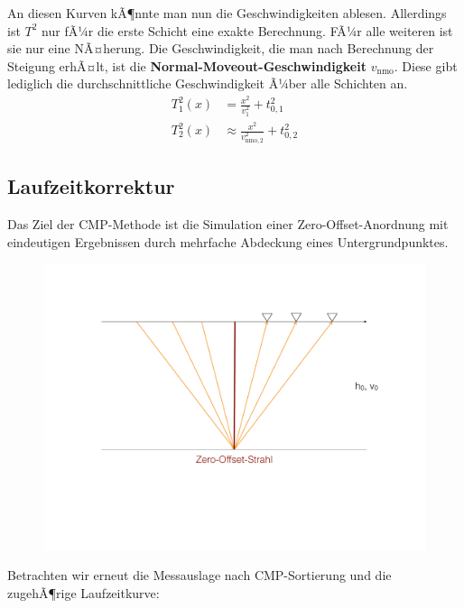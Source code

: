 An diesen Kurven kÃ¶nnte man nun die Geschwindigkeiten ablesen. Allerdings ist $T^2$ nur fÃ¼r die erste Schicht eine exakte Berechnung. FÃ¼r alle weiteren ist sie nur eine NÃ¤herung. Die Geschwindigkeit, die man nach Berechnung der Steigung erhÃ¤lt, ist die \textbf{Normal-Moveout-Geschwindigkeit} $v_{\text{nmo}}$. Diese gibt lediglich die durchschnittliche Geschwindigkeit Ã¼ber alle Schichten an. \begin{align*}
	T_1^2(x) &= \frac{x^2}{v_1^2} + t_{0,1}^2 \\
	T_2^2(x) &\approx \frac{x^2}{v_{\text{nmo},2}^2} + t_{0,2}^2
\end{align*}

\subsection{Laufzeitkorrektur}
Das Ziel der CMP-Methode ist die Simulation einer Zero-Offset-Anordnung mit eindeutigen Ergebnissen durch mehrfache Abdeckung eines Untergrundpunktes. 

\begin{figure}[H]
	\centering
	\includegraphics[width = \textwidth]{ReflexionsseismikBilder/ZeroOffsetStrahl}
\end{figure}

Betrachten wir erneut die Messauslage nach CMP-Sortierung und die zugehÃ¶rige Laufzeitkurve: 

